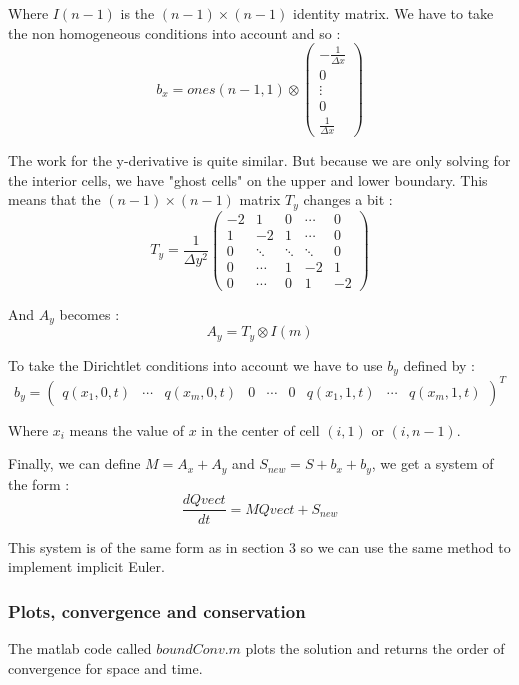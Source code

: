 Where $I(n-1)$ is the $(n-1)\times (n-1)$ identity matrix. We have to take the non homogeneous conditions into account and so :
$$b_x = ones(n-1,1) \otimes \left(\begin{array}{c}
-\frac{1}{\Delta x} \\ 
0 \\ 
\vdots \\ 
0 \\ 
\frac{1}{\Delta x}
\end{array}\right)$$

The work for the y-derivative is quite similar. But because we are only solving for the interior cells, we have "ghost cells" on the upper and lower boundary. This means that the $(n-1)\times (n-1)$ matrix $T_y$ changes a bit : 
$$T_y = \frac{1}{\Delta y^2}\left(\begin{array}{ccccc}
-2 & 1 & 0 & \cdots & 0 \\ 
1 & -2 & 1 & \cdots & 0 \\ 
0& \ddots & \ddots & \ddots & 0 \\ 
0 & \cdots & 1 & -2 & 1 \\
0 & \cdots & 0 & 1 & -2
\end{array}\right) $$

And $A_y$ becomes : 
$$A_y = T_y \otimes I(m)$$

To take the Dirichtlet conditions into account we have to use $b_y$ defined by :
$$b_y = \left(\begin{array}{ccccccccc}
q(x_1,0,t) & \cdots & q(x_m,0,t) & 0 & \cdots & 0 & q(x_1,1,t) & \cdots & q(x_m,1,t)
\end{array}\right)^T $$

Where $x_i$ means the value of $x$ in the center of cell $(i,1)$ or $(i,n-1)$.

Finally, we can define $M=A_x+A_y$ and $S_{new}=S+b_x+b_y$, we get a system of the form :
$$\frac{dQvect}{dt}=MQvect+S_{new}$$

This system is of the same form as in section 3 so we can use the same method to implement implicit Euler.


\subsubsection{Plots, convergence and conservation}
The matlab code called $boundConv.m$ plots the solution and returns the order of convergence for space and time.

